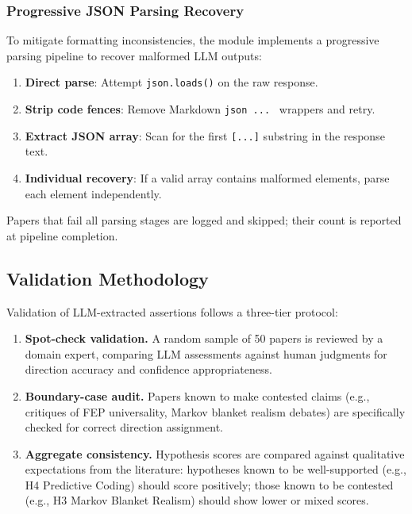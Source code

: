 \documentclass[
]{article}
\providecommand{\tightlist}{%
  \setlength{\itemsep}{0pt}\setlength{\parskip}{0pt}}
\begin{document}
\subsubsection{Progressive JSON Parsing
Recovery}\label{progressive-json-parsing-recovery}

To mitigate formatting inconsistencies, the module implements a
progressive parsing pipeline to recover malformed LLM outputs:

\begin{enumerate}
\def\labelenumi{\arabic{enumi}.}
\tightlist
\item
  \textbf{Direct parse}: Attempt \texttt{json.loads()} on the raw
  response.
\item
  \textbf{Strip code fences}: Remove Markdown
  \texttt{\textasciigrave{}\textasciigrave{}\textasciigrave{}json\ ...\ \textasciigrave{}\textasciigrave{}\textasciigrave{}}
  wrappers and retry.
\item
  \textbf{Extract JSON array}: Scan for the first \texttt{{[}...{]}}
  substring in the response text.
\item
  \textbf{Individual recovery}: If a valid array contains malformed
  elements, parse each element independently.
\end{enumerate}

Papers that fail all parsing stages are logged and skipped; their count
is reported at pipeline completion.

\subsection{Validation Methodology}\label{validation-methodology}

Validation of LLM-extracted assertions follows a three-tier protocol:

\begin{enumerate}
\def\labelenumi{\arabic{enumi}.}
\item
  \textbf{Spot-check validation.} A random sample of 50 papers is
  reviewed by a domain expert, comparing LLM assessments against human
  judgments for direction accuracy and confidence appropriateness.
\item
  \textbf{Boundary-case audit.} Papers known to make contested claims
  (e.g., critiques of FEP universality, Markov blanket realism debates)
  are specifically checked for correct direction assignment.
\item
  \textbf{Aggregate consistency.} Hypothesis scores are compared against
  qualitative expectations from the literature: hypotheses known to be
  well-supported (e.g., H4 Predictive Coding) should score positively;
  those known to be contested (e.g., H3 Markov Blanket Realism) should
  show lower or mixed scores.
\end{enumerate}
\end{document}
